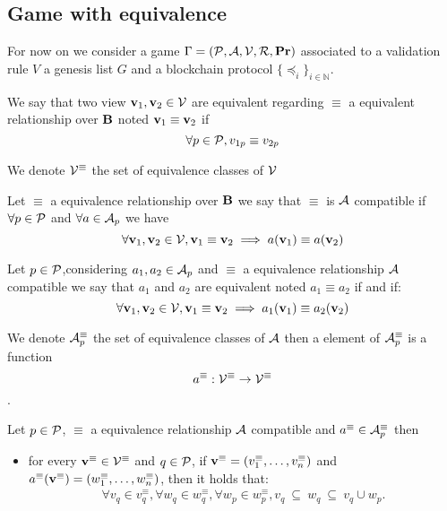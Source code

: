 \subsection{Game with equivalence}

For now on we consider a game $\Gamma = (\mathcal{P},\mathcal{A},\mathcal{V},\mathcal{R},\mathbf{Pr})$ associated to  a validation rule $V$ a genesis list $G$ and a blockchain protocol $\{ \preceq_i\}_{i \in \mathbb{N}}$. 

We say that two view $\mathbf{v}_1, \mathbf{v}_2 \in \mathcal{V}$ are equivalent regarding $\equiv$ a equivalent relationship over $\text{\bf B}$ noted $\mathbf{v}_1\equiv \mathbf{v}_2$ if $$\forall p \in \mathcal{P}, v_{1p} \equiv v_{2p}$$

We denote $\mathcal{V}^\equiv$ the set of equivalence classes of $\mathcal{V}$

\begin{mydef}
	Let $\equiv$ a equivalence relationship over $\text{\bf B}$ we say that $\equiv$ is $\mathcal{A}$ compatible if $\forall p \in \mathcal{P}$ and $\forall a \in \mathcal{A}_p$ we have $$\forall \mathbf{v}_1,\mathbf{v}_2 \in \mathcal{V}, \mathbf{v}_1 \equiv \mathbf{v}_2 \implies a(\mathbf{v}_1) \equiv a(\mathbf{v}_2 )$$
\end{mydef}

\begin{mydef}
	Let $p \in \mathcal{P}$,considering $a_1, a_2 \in \mathcal{A}_p$ and $\equiv$ a equivalence relationship $\mathcal{A}$ compatible we say that $a_1$ and $a_2$ are equivalent noted $a_1 \equiv a_2$ if and if:
	$$\forall \mathbf{v}_1,\mathbf{v}_2 \in \mathcal{V}, \mathbf{v}_1 \equiv \mathbf{v}_2 \implies a_1(\mathbf{v}_1) \equiv a_2(\mathbf{v}_2)$$
\end{mydef}
We denote $\mathcal{A}^\equiv_p$ the set of equivalence classes of $\mathcal{A}$ then a element of $\mathcal{A}^\equiv_p$ is a function $$a^\equiv : \mathcal{V}^\equiv \rightarrow \mathcal{V}^\equiv$$.

\begin{myprop}
	Let $p \in \mathcal{P}$, $\equiv$ a equivalence relationship $\mathcal{A}$ compatible and $a^\equiv \in \mathcal{A}^\equiv_p $ then
	\begin{itemize}
		\item for every $\mathbf{v}^\equiv \in \mathcal{V}^\equiv$ and $q \in \mathcal{P}$, if $\mathbf{v}^\equiv = (v_1^\equiv, \ldots, v_n^\equiv)$ and $a^\equiv(\mathbf{v}^\equiv) = (w_1^\equiv, \ldots, w_n^\equiv)$, then it holds that:
		\begin{eqnarray*}
			\forall v_q \in v_q ^\equiv,\forall w_q \in w_q ^\equiv,\forall w_p \in w_p ^\equiv,  v_q \ \subseteq \ w_q \ \subseteq \ v_q \cup w_p.
		\end{eqnarray*}
	\end{itemize}
\end{myprop}

